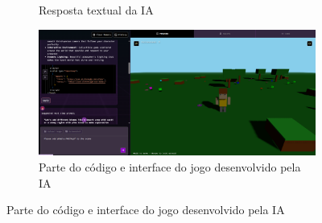 \begin{figure}[htbp]
\begin{subfigure}{0.45\linewidth}
        \caption{\small Resposta textual da IA}
        \label{fig:rosebud1b}
    \end{subfigure}
    \begin{subfigure}{1\linewidth}
        \includegraphics[width=1\linewidth]{figs/rosebud/rosebud_resultado_tela2.PNG}
        \caption{\small Parte do código e interface do jogo desenvolvido pela IA}
        \label{fig:rosebud1c}
    \end{subfigure}

    
\end{figure}

